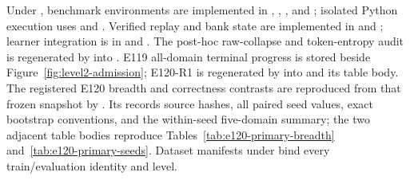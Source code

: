 \documentclass{article}
\newcommand{\1}{\mathbf 1}
\theoremstyle{remark}
\theoremstyle{definition}
\theoremstyle{plain}
\begin{document}
Under , benchmark environments are implemented in
, , , and
; isolated Python execution uses
 and .
Verified replay and bank state are implemented in
 and ; learner
integration is in  and . The
post-hoc raw-collapse and token-entropy audit is regenerated by
 into
. E119 all-domain
terminal progress is stored beside Figure~\ref{fig:level2-admission}; E120-R1 is
regenerated by 
into  and its table body.
The registered E120 breadth and correctness contrasts are reproduced from
that frozen snapshot by
. Its
 records source hashes, all
paired seed values, exact bootstrap conventions, and the within-seed
five-domain summary; the two adjacent table bodies reproduce
Tables~\ref{tab:e120-primary-breadth} and~\ref{tab:e120-primary-seeds}.
Dataset manifests under  bind every train/evaluation identity
and level.
\end{document}
